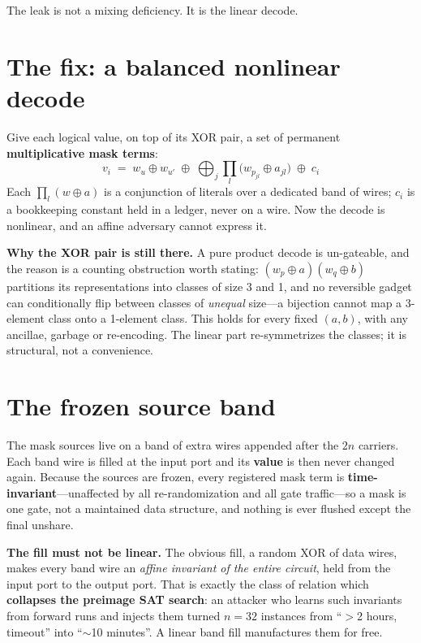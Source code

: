 \documentclass[11pt]{article}
\newcommand{\xor}{\oplus}
\begin{document}
The leak is not a mixing deficiency. It is the linear decode.

\section{The fix: a balanced nonlinear decode}

Give each logical value, on top of its XOR pair, a set of permanent
\textbf{multiplicative mask terms}:
\[
v_i \;=\; w_u \xor w_{u'} \;\xor\; \bigoplus_j \prod_l \bigl(w_{p_{jl}} \xor a_{jl}\bigr) \;\xor\; c_i
\]
Each $\prod_l (w\xor a)$ is a conjunction of literals over a dedicated band of
wires; $c_i$ is a bookkeeping constant held in a ledger, never on a wire. Now
the decode is nonlinear, and an affine adversary cannot express it.

\textbf{Why the XOR pair is still there.} A pure product decode is un-gateable,
and the reason is a counting obstruction worth stating: $(w_p\xor a)(w_q\xor b)$
partitions its representations into classes of size 3 and 1, and no reversible
gadget can conditionally flip between classes of \emph{unequal} size---a
bijection cannot map a 3-element class onto a 1-element class. This holds for
every fixed $(a,b)$, with any ancillae, garbage or re-encoding. The linear part
re-symmetrizes the classes; it is structural, not a convenience.

\section{The frozen source band}

The mask sources live on a band of extra wires appended after the $2n$ carriers.
Each band wire is filled at the input port and its \textbf{value} is then never
changed again. Because the sources are frozen, every registered mask term is
\textbf{time-invariant}---unaffected by all re-randomization and all gate
traffic---so a mask is one gate, not a maintained data structure, and nothing is
ever flushed except the final unshare.

\textbf{The fill must not be linear.} The obvious fill, a random XOR of data
wires, makes every band wire an \emph{affine invariant of the entire circuit},
held from the input port to the output port. That is exactly the class of
relation which \textbf{collapses the preimage SAT search}: an attacker who
learns such invariants from forward runs and injects them turned $n{=}32$
instances from ``$>$2 hours, timeout'' into ``$\sim$10 minutes''. A linear band
fill manufactures them for free.
\end{document}
